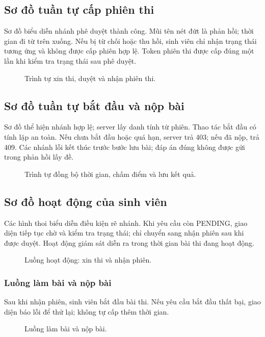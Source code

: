 \subsection{Sơ đồ tuần tự cấp phiên thi}
Sơ đồ biểu diễn nhánh phê duyệt thành công. Mũi tên nét đứt là phản hồi; thời gian đi từ trên xuống. Nếu bị từ chối hoặc thu hồi, sinh viên chỉ nhận trạng thái tương ứng và không được cấp phiên hợp lệ. Token phiên thi được cấp đúng một lần khi kiểm tra trạng thái sau phê duyệt.
\begin{figure}[H]\centering
\caption{Trình tự xin thi, duyệt và nhận phiên thi.}\end{figure}
\clearpage
\subsection{Sơ đồ tuần tự bắt đầu và nộp bài}
Sơ đồ thể hiện nhánh hợp lệ; server lấy danh tính từ phiên. Thao tác bắt đầu có tính lặp an toàn. Nếu chưa bắt đầu hoặc quá hạn, server trả 403; nếu đã nộp, trả 409. Các nhánh lỗi kết thúc trước bước lưu bài; đáp án đúng không được gửi trong phản hồi lấy đề.
\begin{figure}[H]\centering
\caption{Trình tự đồng bộ thời gian, chấm điểm và lưu kết quả.}\end{figure}
\clearpage
\subsection{Sơ đồ hoạt động của sinh viên}
Các hình thoi biểu diễn điều kiện rẽ nhánh. Khi yêu cầu còn PENDING, giao diện tiếp tục chờ và kiểm tra trạng thái; chỉ chuyển sang nhận phiên sau khi được duyệt. Hoạt động giám sát diễn ra trong thời gian bài thi đang hoạt động.
\begin{figure}[H]\centering
\caption{Luồng hoạt động: xin thi và nhận phiên.}\end{figure}
\clearpage
\subsubsection*{Luồng làm bài và nộp bài}
Sau khi nhận phiên, sinh viên bắt đầu bài thi. Nếu yêu cầu bắt đầu thất bại, giao diện báo lỗi để thử lại; không tự cấp thêm thời gian.
\begin{figure}[H]\centering
\caption{Luồng làm bài và nộp bài.}\end{figure}
\clearpage
